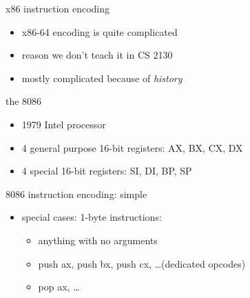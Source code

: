 \usetikzlibrary{chains}

\begin{frame}{x86 instruction encoding}
\begin{itemize}
\item x86-64 encoding is quite complicated
\item reason we don't teach it in CS 2130
\vspace{.5cm}
\item mostly complicated because of \textit{history}
\end{itemize}
\end{frame}

\begin{frame}{the 8086}
\begin{itemize}
    \item 1979 Intel processor
    \item 4 general purpose 16-bit registers: AX, BX, CX, DX
    \item 4 special 16-bit registers: SI, DI, BP, SP
\end{itemize}
\end{frame}

\begin{frame}{8086 instruction encoding: simple}
\begin{itemize}
    \item special cases: 1-byte instructions:
    \begin{itemize}
    \item anything with no arguments
    \item push ax, push bx, push cx, \ldots (dedicated opcodes)
    \item pop ax, \ldots
    \end{itemize}
\end{itemize}
\end{frame}


